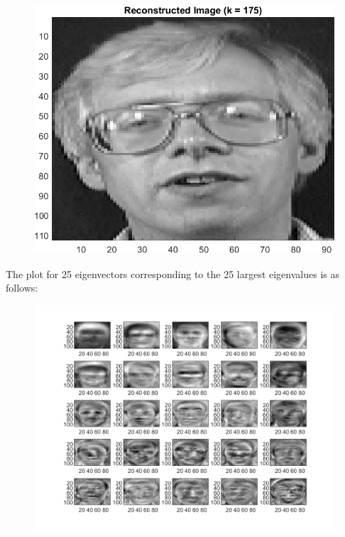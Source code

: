\documentclass{article}
\begin{document}
\begin{figure}[!htb]
    \begin{minipage}[b]{0.3\textwidth}
        \includegraphics[width=\textwidth]{orl_recon_175.png}
    \end{minipage}
\end{figure}

\newpage
The plot for 25 eigenvectors corresponding to the 25 largest eigenvalues is as follows:

\begin{figure}[!htb]
    \centering
    \includegraphics[width=\textwidth]{orl_25_subplot.png}
\end{figure}
\end{document}
